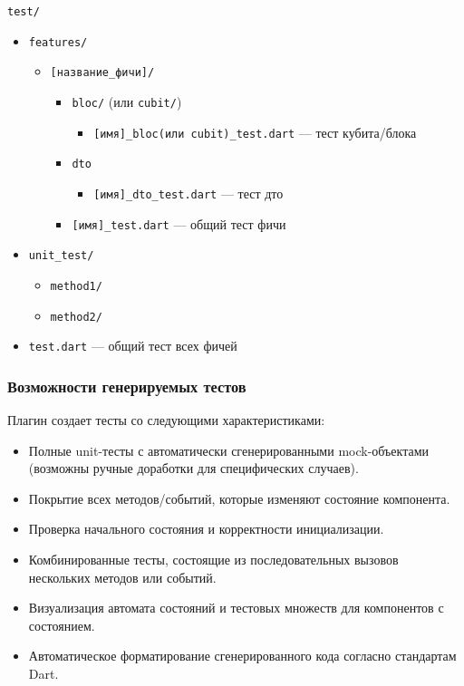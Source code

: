 \documentclass[14pt, russian]{scrartcl}
\begin{document}
\texttt{test/}
\begin{itemize}
    \item \texttt{features/}
    \begin{itemize}
        \item \texttt{[название\_фичи]/}
        \begin{itemize}
            \item \texttt{bloc/} (или \texttt{cubit/})
            \begin{itemize}
                \item \texttt{[имя]\_bloc(или cubit)\_test.dart} --- тест кубита/блока
            \end{itemize}
            \item \texttt{dto}
            \begin{itemize}
                \item \texttt{[имя]\_dto\_test.dart} --- тест дто
            \end{itemize}
            \item \texttt{[имя]\_test.dart} --- общий тест фичи
        \end{itemize}
    \end{itemize}
    \item \texttt{unit\_test/}
    \begin{itemize}
        \item \texttt{method1/}
        \item \texttt{method2/}
    \end{itemize}
    \item \texttt{test.dart} --- общий тест всех фичей
\end{itemize}

\subsubsection{Возможности генерируемых тестов}

Плагин создает тесты со следующими характеристиками:

\begin{itemize}
    \item Полные unit-тесты с автоматически сгенерированными mock-объектами (возможны ручные доработки для специфических случаев).
    \item Покрытие всех методов/событий, которые изменяют состояние компонента.
    \item Проверка начального состояния и корректности инициализации.
    \item Комбинированные тесты, состоящие из последовательных вызовов нескольких методов или событий.
    \item Визуализация автомата состояний и тестовых множеств для компонентов с состоянием.
    \item Автоматическое форматирование сгенерированного кода согласно стандартам Dart.
\end{itemize}
\end{document}
